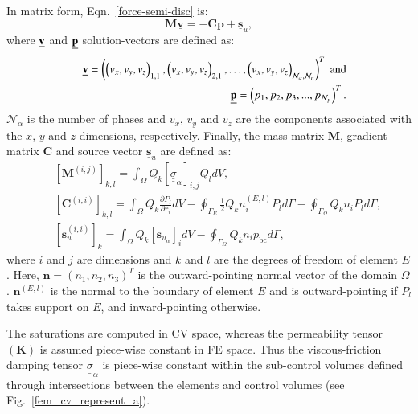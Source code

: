 \documentclass[preprint,authoryear,12pt]{elsarticle}
\begin{document}
In matrix form, Eqn.~\ref{force-semi-disc} is:
\begin{equation}
  {\mathbf M} \underline {\mathbf v} = -{\mathbf C} \underline
  {\mathbf p} + \underline {\mathbf
    s}_{u}, \label{force-balance-matrix-form}
\end{equation}
where $\underline{\bf v}$ and $\underline{\bf p}$ solution-vectors are
defined as:
\begin{eqnarray}
  &&\underline{{\bf v}} = \left( 
  \left( {v_x},{v_y},{v_z} \right)  _{1,1},
  \left( {v_x},{v_y},{v_z} \right)  _{2,1},\ldots,
  \left( {v_x},{v_y},{v_z} \right)  _{\mathcal{N}_\alpha,\mathcal{N}_u}
  \right)^{T}
  \;\text{and} \nonumber \\ &&
  \underline{{\bf p}} = \left(p_1, p_2, p_3, ...,
  p_{\mathcal{N}_p}\right)^T. \nonumber \nonumber
\end{eqnarray}
$\mathcal{N}_{\alpha}$ is the number of phases and $v_x$, $v_y$ and
$v_z$ are the components associated with the $x$, $y$ and $z$
dimensions, respectively. Finally, the mass matrix ${\mathbf M}$,
gradient matrix ${\mathbf C}$ and source vector $\underline {\mathbf
  s}_{u}$ are defined as:
\begin{eqnarray}
  && \left[{\mathbf M}^{(i,j)}\right]_{k,l} = \int_{\Omega} Q_{k}
  \left[\underline{\underline{\sigma}}_{\alpha}\right]_{i,j} {Q}_{l}
  dV, \nonumber \\ && {\left[\bm{C}^{(i,i)}\right]_{k,l} =
    \int_{\Omega} Q_{k} \frac{\partial P_{l}}{\partial r_i} dV -
    \oint_{\Gamma_{E}} \displaystyle\frac{1}{2} Q_{k} n_i^{(E,l)}
    P_{l} d\Gamma - \oint_{\Gamma_{\Omega}} \displaystyle Q_{k} n_i
    P_{l} d\Gamma}, \nonumber \\ &&
  {\left[\bm{s}_{u}^{(i,i)}\right]_{k} = \int_{\Omega} Q_k}
  \left[{\mathbf s}_{u_\alpha} \right]_i dV -
  \oint_{\Gamma_{\Omega}}\displaystyle Q_{k} n_i p_\text{bc} d\Gamma,
  \nonumber
\end{eqnarray}
where $i$ and $j$ are dimensions and $k$ and $l$ are the degrees of
freedom of element $E$. Here, $\bm{n} = \left(n_{1}, n_{2},
n_{3}\right)^{T}$ is the outward-pointing normal vector of the domain
$\Omega$. $\bm{n}^{(E,l)}$ is the normal to the boundary of element
$E$ and is outward-pointing if $P_{l}$ takes support on $E$, and
inward-pointing otherwise.

The saturations are computed in CV space, whereas the permeability
tensor $\left(\mathbf{K}\right)$ is assumed piece-wise constant in FE
space. Thus the viscous-friction damping tensor $ {\underline
  {\underline \sigma}}_{\alpha}$ is piece-wise constant within the
sub-control volumes defined through intersections between the elements
and control volumes (see Fig.~\ref{fem_cv_represent_a}).
\end{document}
